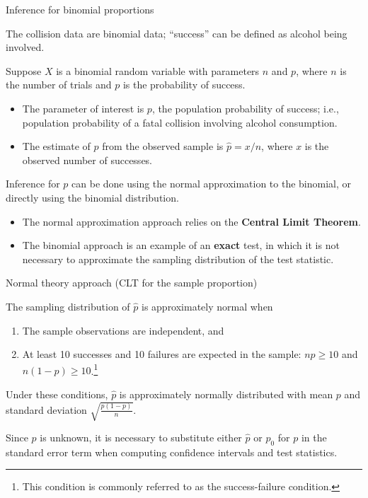 \documentclass[
  ignorenonframetext,
  aspectratio=169]{beamer}
\begin{document}
\begin{frame}{Inference for binomial proportions}
\protect\hypertarget{inference-for-binomial-proportions-1}{}
\small

The collision data are binomial data; ``success'' can be defined as
alcohol being involved.

Suppose \(X\) is a binomial random variable with parameters \(n\) and
\(p\), where \(n\) is the number of trials and \(p\) is the probability
of success.

\begin{itemize}
\item
  The parameter of interest is \(p\), the population probability of
  success; i.e., population probability of a fatal collision involving
  alcohol consumption.
\item
  The estimate of \(p\) from the observed sample is \(\hat{p} = x/n\),
  where \(x\) is the observed number of successes.
\end{itemize}

Inference for \(p\) can be done using the normal approximation to the
binomial, or directly using the binomial distribution.

\begin{itemize}
\item
  The normal approximation approach relies on the \textbf{Central Limit
  Theorem}.
\item
  The binomial approach is an example of an \textbf{exact} test, in
  which it is not necessary to approximate the sampling distribution of
  the test statistic.
\end{itemize}
\end{frame}

\begin{frame}{Normal theory approach (CLT for the sample proportion)}
\protect\hypertarget{normal-theory-approach-clt-for-the-sample-proportion}{}
\small

The sampling distribution of \(\hat{p}\) is approximately normal when

\begin{enumerate}
\item
  The sample observations are independent, and
\item
  At least 10 successes and 10 failures are expected in the sample:
  \(np \geq 10\) and
  \(n(1-p) \geq 10\).\footnote{This condition is commonly referred to as the success-failure condition.}
\end{enumerate}

Under these conditions, \(\hat{p}\) is approximately normally
distributed with mean \(p\) and standard deviation
\(\sqrt{\frac{p(1-p)}{n}}\).

Since \(p\) is unknown, it is necessary to substitute either \(\hat{p}\)
or \(p_0\) for \(p\) in the standard error term when computing
confidence intervals and test statistics.
\end{frame}
\end{document}
